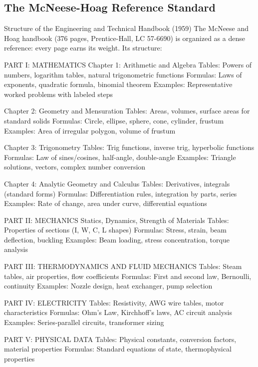 \documentclass[11pt,letterpaper]{article}
\begin{document}
\subsection{The McNeese-Hoag Reference Standard}

\begin{mhbox}{Structure of the Engineering and Technical Handbook (1959)}
The McNeese and Hoag handbook (376 pages, Prentice-Hall, LC 57-6690) is organized as a
dense reference: every page earns its weight. Its structure:

PART I: MATHEMATICS
  Chapter 1: Arithmetic and Algebra
    Tables: Powers of numbers, logarithm tables, natural trigonometric functions
    Formulas: Laws of exponents, quadratic formula, binomial theorem
    Examples: Representative worked problems with labeled steps

  Chapter 2: Geometry and Mensuration
    Tables: Areas, volumes, surface areas for standard solids
    Formulas: Circle, ellipse, sphere, cone, cylinder, frustum
    Examples: Area of irregular polygon, volume of frustum

  Chapter 3: Trigonometry
    Tables: Trig functions, inverse trig, hyperbolic functions
    Formulas: Law of sines/cosines, half-angle, double-angle
    Examples: Triangle solutions, vectors, complex number conversion

  Chapter 4: Analytic Geometry and Calculus
    Tables: Derivatives, integrals (standard forms)
    Formulas: Differentiation rules, integration by parts, series
    Examples: Rate of change, area under curve, differential equations

PART II: MECHANICS
  Statics, Dynamics, Strength of Materials
  Tables: Properties of sections (I, W, C, L shapes)
  Formulas: Stress, strain, beam deflection, buckling
  Examples: Beam loading, stress concentration, torque analysis

PART III: THERMODYNAMICS AND FLUID MECHANICS
  Tables: Steam tables, air properties, flow coefficients
  Formulas: First and second law, Bernoulli, continuity
  Examples: Nozzle design, heat exchanger, pump selection

PART IV: ELECTRICITY
  Tables: Resistivity, AWG wire tables, motor characteristics
  Formulas: Ohm's Law, Kirchhoff's laws, AC circuit analysis
  Examples: Series-parallel circuits, transformer sizing

PART V: PHYSICAL DATA
  Tables: Physical constants, conversion factors, material properties
  Formulas: Standard equations of state, thermophysical properties
\end{mhbox}
\end{document}
